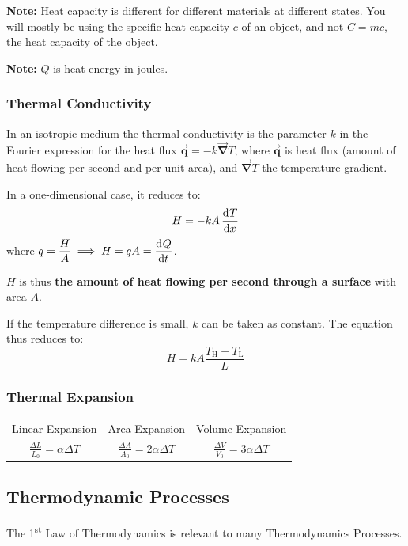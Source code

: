 \documentclass[11pt]{article}
\numberwithin{equation}{section}
\newcommand{\bvec}[1]{\boldsymbol{\vec{#1}}}
\begin{document}
			\textbf{Note:} Heat capacity is different for different materials at different states. You will mostly be using the specific heat capacity $c$ of an object, and not $C = mc$, the heat capacity of the object.
			
			\textbf{Note:} $Q$ is heat energy in joules.
			
			\subsubsection{Thermal Conductivity}
				In an isotropic medium the thermal conductivity is the parameter $k$ in the Fourier expression for the heat flux $\bvec{q} = -k\bvec{\nabla}T$, where $\bvec{q}$ is heat flux (amount of heat flowing per second and per unit area), and $\bvec{\nabla}T$ the temperature gradient.
				
				In a one-dimensional case, it reduces to:
				\begin{equation*}
					H=-kA\dod{T}{x}
					\vspace{-0.5em}
				\end{equation*}
				where $\displaystyle q = \frac{H}{A} \implies H = qA = \dod{Q}{t}$. 
				
				$H$ is thus \textbf{the amount of heat flowing per second through a surface} with area $A$.
				
				If the temperature difference is small, $k$ can be taken as constant. The equation thus reduces to:
				\begin{equation*}
					H=kA{\frac {T_{\text{H}}-T_{\text{L}}}{L}}
				\end{equation*}
			\subsubsection{Thermal Expansion}
			\begin{center}
				\renewcommand{\arraystretch}{1.2}
				\begin{tabular}{@{} ccc @{}}
					\toprule
					Linear Expansion & Area Expansion & Volume Expansion \\[0.5em]
					$\displaystyle \frac{\Delta L}{L_0} = \alpha \Delta T$ & $\displaystyle \frac{\Delta A}{A_0} = 2\alpha \Delta T$ & $\displaystyle \frac{\Delta V}{V_0} = 3\alpha \Delta T$ \\[0.5em]
					\bottomrule
				\end{tabular}
			\end{center}
		\pagebreak
		\subsection{Thermodynamic Processes}
			The 1\textsuperscript{st} Law of Thermodynamics is relevant to many Thermodynamics Processes.
			
\end{document}
